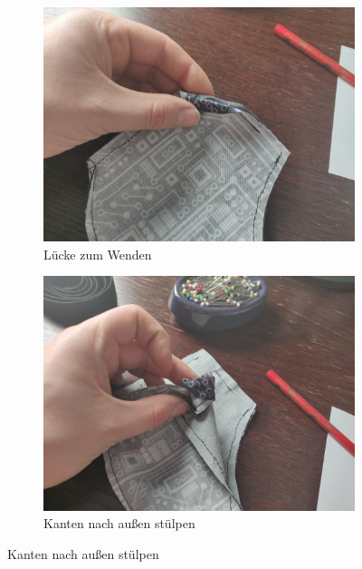 \documentclass[12pt,parskip=full]{scrartcl}
\begin{document}
\begin{figure}[hb]
    \vspace{0.5cm}
    \centering
    \begin{subfigure}{0.48\textwidth}
        \centering
        \includegraphics[width = \linewidth]{Pictures/07_Turning/Turning1_resized.jpg}
        \caption{Lücke zum Wenden}
        \label{Turning1}
    \end{subfigure}
    \begin{subfigure}{0.48\textwidth}
        \centering
        \includegraphics[width = \linewidth]{Pictures/07_Turning/Turning2_resized.jpg}
        \caption{Kanten nach außen stülpen}
        \label{Turning2}
    \end{subfigure}
    \label{TurningFirst}
\end{figure}
    
\end{document}
